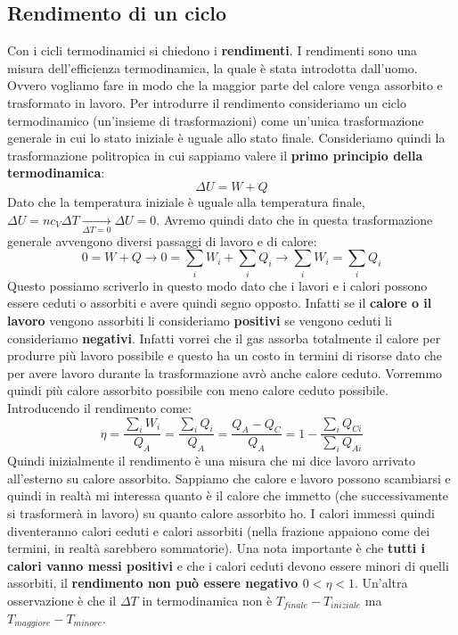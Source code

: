 \documentclass{article}
\numberwithin{equation}{subsection}
\begin{document}
\subsection{Rendimento di un ciclo}
Con i cicli termodinamici si chiedono i \textbf{rendimenti}. I rendimenti sono una misura dell'efficienza termodinamica, la quale è stata introdotta dall'uomo. Ovvero vogliamo fare in modo che la maggior parte del calore venga assorbito e trasformato in lavoro. Per introdurre il rendimento consideriamo un ciclo termodinamico (un'insieme di trasformazioni) come un'unica trasformazione generale in cui lo stato iniziale è uguale allo stato finale. Consideriamo quindi la trasformazione politropica in cui sappiamo valere il \textbf{primo principio della termodinamica}:
\begin{equation}
    \Delta U = W+Q 
\end{equation}
Dato che la temperatura iniziale è uguale alla temperatura finale, $\Delta U = nc_V\Delta T\xrightarrow[\Delta T=0]{}\Delta U=0$. Avremo quindi dato che in questa trasformazione generale avvengono diversi passaggi di lavoro e di calore:
\begin{equation}
    0=W+Q \xrightarrow[]{} 0=\sum_i W_i+\sum_i Q_i \xrightarrow[]{} \sum_i W_i= \sum_i Q_i
\end{equation}
Questo possiamo scriverlo in questo modo dato che i lavori e i calori possono essere ceduti o assorbiti e avere quindi segno opposto. Infatti se il \textbf{calore o il lavoro} vengono assorbiti li consideriamo \textbf{positivi} se vengono ceduti li consideriamo \textbf{negativi}. Infatti vorrei che il gas assorba totalmente il calore per produrre più lavoro possibile e questo ha un costo in termini di risorse dato che per avere lavoro durante la trasformazione avrò anche calore ceduto. Vorremmo quindi più calore assorbito possibile con meno calore ceduto possibile. Introducendo il rendimento come:
\begin{equation}
    \eta = \frac{\sum_iW_i}{Q_A}=\frac{\sum_iQ_i}{Q_A}=\frac{Q_A-Q_C}{Q_A}=1-\frac{\sum_iQ_{Ci}}{\sum_iQ_{Ai}}
\end{equation}
Quindi inizialmente il rendimento è una misura che mi dice lavoro arrivato all'esterno su calore assorbito. Sappiamo che calore e lavoro possono scambiarsi e quindi in realtà mi interessa quanto è il calore che immetto (che successivamente si trasformerà in lavoro) su quanto calore assorbito ho. I calori immessi quindi diventeranno calori ceduti e calori assorbiti (nella frazione appaiono come dei termini, in realtà sarebbero sommatorie). Una nota importante è che \textbf{tutti i calori vanno messi positivi} e che i calori ceduti devono essere minori di quelli assorbiti, il \textbf{rendimento non può essere negativo $0<\eta<1$}. Un'altra osservazione è che il $\Delta T$ in termodinamica non è $T_{finale}-T_{iniziale}$ ma $T_{maggiore}-T_{minore}$.
\end{document}
